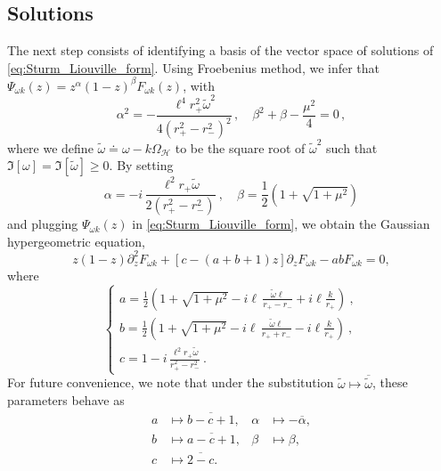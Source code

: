 \documentclass[aps, prd, amsmath, floats, floatfix, twocolumn, nofootinbib, superscriptaddress, showpacs]{revtex4-1}
\def\tomega{{\tilde{\omega}}}
\begin{document}
\subsection{Solutions}
	
The next step consists of identifying a basis of the vector space of solutions of \eqref{eq:Sturm_Liouville_form}. Using Froebenius method, we infer that $\Psi_{\omega k}(z)=z^\alpha(1-z)^\beta F_{\omega k}(z)$, with 
%
\begin{equation}\label{eq:Frobenius_prequel}
\alpha^2=-\frac{\ell^4 r_+^2 \tilde{\omega}^2}{4 (r_{+}^2 - r_{-}^2)^2} \, , \quad \beta^2+\beta-\frac{\mu^2}{4}=0 \, ,
\end{equation}
%
where we define $\tilde{\omega} \doteq \omega-k\Omega_{\mathcal{H}}$ to be the square root of $\tilde{\omega}^2$ such that $\Im[\omega]=\Im[\tilde{\omega}] \geqslant 0$. By setting
%
	\begin{equation}\label{eq:Frobenius}
	\alpha = -i \, \frac{\ell^2 r_+ \tilde{\omega}}{2 (r_{+}^2 - r_{-}^2)}\ , \quad
	\beta = \frac{1}{2}\left(1 + \sqrt{1+\mu^2}\right)
	\end{equation}
	and plugging $\Psi_{\omega k}(z)$ in \eqref{eq:Sturm_Liouville_form}, we obtain the Gaussian hypergeometric equation,
	\begin{equation} \label{radialeq}
	z(1-z)\partial^2_z F_{\omega k} + [c -(a+b+1)z]\partial_z F_{\omega k} -ab F_{\omega k} =0 ,
	\end{equation}
	where
	\begin{equation}\label{eq:parameters}
	\begin{cases}
	\displaystyle a= \frac{1}{2}\left(1 + \sqrt{1 + \mu^2} - i\ell \, \frac{\tilde{\omega}\ell}{r_{+}-r_{-}} + i\ell\frac{k}{r_+}\right)\ , \\
	\displaystyle b= \frac{1}{2}\left(1 + \sqrt{1 + \mu^2} - i\ell \, \frac{\tilde{\omega}\ell}{r_{+} + r_{-}} - i\ell\frac{k}{r_+}\right)\ , \\
	\displaystyle c= 1 - i \, \frac{\ell^2 r_+ \tilde{\omega}}{r_{+}^2 - r_{-}^2}\ .
	\end{cases}
	\end{equation}
	For future convenience, we note that under the substitution $\tomega \mapsto \overline{\tomega}$, these parameters behave as
	\begin{equation}\label{eq:parameters-cc}
	\begin{aligned}
		a &\mapsto \overline{b-c+1} , & \alpha &\mapsto -\overline{\alpha} , \\ 
		b &\mapsto \overline{a-c+1} , & \beta &\mapsto \beta , \\
		c &\mapsto \overline{2-c} .
	\end{aligned}
	\end{equation}
	
\end{document}
